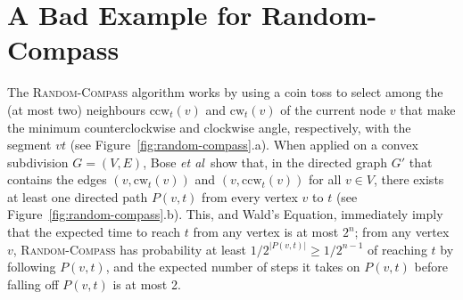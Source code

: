 \documentclass{elsarticle}
\newcommand{\etal}{\emph{et al}}
\newcommand{\ccw}{\mathrm{ccw}}
\newcommand{\cw}{\mathrm{cw}}
\begin{document}
\section{A Bad Example for Random-Compass}

The \textsc{Random-Compass} algorithm works by using a coin toss to select among the (at most two) neighbours $\ccw_t(v)$ and $\cw_t(v)$ of the current node $v$ that make the minimum counterclockwise and clockwise angle, respectively, with the segment $vt$ (see Figure~\ref{fig:random-compass}.a). When applied on a convex subdivision $G=(V,E)$, Bose \etal\ show that, in the directed graph $G'$ that contains the edges $(v,\cw_t(v))$ and $(v,\ccw_t(v))$ for all $v\in V$, there exists at least one directed path $P(v,t)$ from every vertex $v$ to $t$ (see Figure~\ref{fig:random-compass}.b).  This, and Wald's Equation, immediately imply that the expected time to reach $t$ from any vertex is at most $2^{n}$; from any vertex $v$, \textsc{Random-Compass} has probability at least $1/2^{|P(v,t)|}\ge 1/2^{n-1}$ of reaching $t$ by following $P(v,t)$, and the expected number of steps it takes on $P(v,t)$ before falling off $P(v,t)$ is at most 2.
\end{document}
